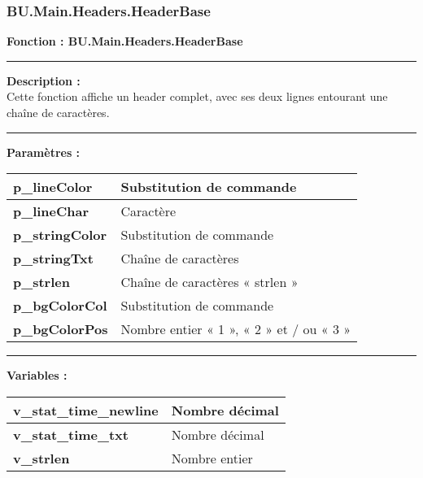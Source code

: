 \documentclass[a4paper,10pt]{article}
\begin{document}
    \color{sec3}
    \subsubsection{BU.Main.Headers.HeaderBase}\color{text}

    \textbf{Fonction : \color{func}BU.Main.Headers.HeaderBase}\\

    \par\noindent\rule{\textwidth}{0.4pt}

    \begin{justify}
        \textbf{Description :}\\[1\baselineskip]
        Cette fonction affiche un header complet, avec ses deux lignes entourant une chaîne de caractères.
    \end{justify}

    \par\noindent\rule{\textwidth}{0.4pt}

    \begin{justify}
        \textbf{Paramètres :}

        \begin{tabular}{|l|l|}
            \hline
            \textbf{\color{vars}p\_lineColor} & Substitution de commande\\
            \hline
            \textbf{\color{vars}p\_lineChar} & Caractère\\
            \hline
            \textbf{\color{vars}p\_stringColor} & Substitution de commande\\
            \hline
            \textbf{\color{vars}p\_stringTxt} & Chaîne de caractères\\
            \hline
            \textbf{\color{vars}p\_strlen} & Chaîne de caractères « strlen »\\
            \hline
            \textbf{\color{vars}p\_bgColorCol} & Substitution de commande\\
            \hline
            \textbf{\color{vars}p\_bgColorPos} & Nombre entier « 1 », « 2 » et / ou « 3 »\\
            \hline
        \end{tabular}
    \end{justify}

    \setlength{\parskip}{2em}
    \par\noindent\rule{\textwidth}{0.4pt}\setlength{\parskip}{1em}

    \begin{justify}
        \textbf{Variables :}\\[1\baselineskip]
        \begin{tabular}{|l|l|}
            \hline
            \textbf{\color{vars}v\_stat\_time\_newline} & Nombre décimal\\
            \hline
            \textbf{\color{vars}v\_stat\_time\_txt} & Nombre décimal\\
            \hline
            \textbf{\color{vars}v\_strlen} & Nombre entier\\
            \hline
        \end{tabular}
    \end{justify}
\end{document}
